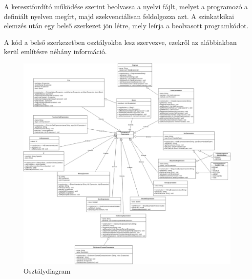 
A keresztfordító működése szerint beolvassa a nyelvi fájlt, melyet a programozó a definiált nyelven megírt, majd szekvenciálisan feldolgozza azt. A szinkatkikai elemzés után egy belső szerkezet jön létre, mely leírja a beolvasott programkódot.

A kód a belső szerkezetben osztályokba lesz szervezve, ezekről az alábbiakban kerül említésre néhány információ.

\begin{figure}
\centering
\includegraphics[scale=1]{kepek/rr_uml.png}
\caption{Osztálydiagram}
\label{fig:process}
\end{figure}

